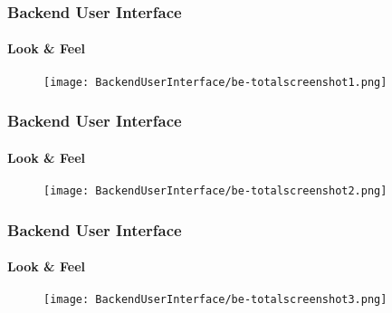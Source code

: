
\begin{frame}[fragile]
	\frametitle{Backend User Interface}
	\framesubtitle{Look \& Feel}

	\begin{figure}
		\texttt{[image: BackendUserInterface/be-totalscreenshot1.png]}
	\end{figure}

\end{frame}


\begin{frame}[fragile]
	\frametitle{Backend User Interface}
	\framesubtitle{Look \& Feel}

	\begin{figure}
		\texttt{[image: BackendUserInterface/be-totalscreenshot2.png]}
	\end{figure}

\end{frame}


\begin{frame}[fragile]
	\frametitle{Backend User Interface}
	\framesubtitle{Look \& Feel}

	\begin{figure}
		\texttt{[image: BackendUserInterface/be-totalscreenshot3.png]}
	\end{figure}

\end{frame}

